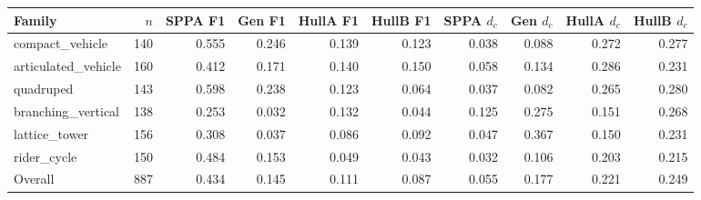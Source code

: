 \begin{tabular}{@{}lrrrrrrrrr@{}}
\toprule
Family & $n$ & SPPA F1 & Gen F1 & HullA F1 & HullB F1 & SPPA $d_c$ & Gen $d_c$ & HullA $d_c$ & HullB $d_c$ \\
\midrule
compact\_vehicle & 140 & 0.555 & 0.246 & 0.139 & 0.123 & 0.038 & 0.088 & 0.272 & 0.277 \\
articulated\_vehicle & 160 & 0.412 & 0.171 & 0.140 & 0.150 & 0.058 & 0.134 & 0.286 & 0.231 \\
quadruped & 143 & 0.598 & 0.238 & 0.123 & 0.064 & 0.037 & 0.082 & 0.265 & 0.280 \\
branching\_vertical & 138 & 0.253 & 0.032 & 0.132 & 0.044 & 0.125 & 0.275 & 0.151 & 0.268 \\
lattice\_tower & 156 & 0.308 & 0.037 & 0.086 & 0.092 & 0.047 & 0.367 & 0.150 & 0.231 \\
rider\_cycle & 150 & 0.484 & 0.153 & 0.049 & 0.043 & 0.032 & 0.106 & 0.203 & 0.215 \\
\midrule
Overall & 887 & 0.434 & 0.145 & 0.111 & 0.087 & 0.055 & 0.177 & 0.221 & 0.249 \\
\bottomrule
\end{tabular}
